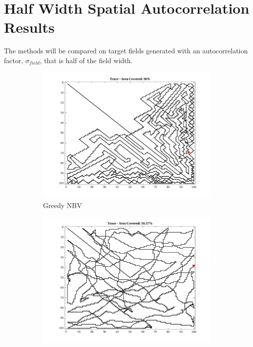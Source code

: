 \section{Half Width Spatial Autocorrelation Results}
The methods will be compared on target fields generated with an autocorrelation factor, $\sigma_{field}$, that is half of the field width.
\begin{figure}[htb!]
    \centering
    \begin{subfigure}[t]{0.25\textwidth}
        \centering
        \includegraphics[width=\linewidth]{figures/path_greedy_30p_100x100_sf_50_seed_1.png}
        \captionsetup{skip=0.20\baselineskip,size=footnotesize}
        \caption{Greedy NBV}
    \end{subfigure}%
    \begin{subfigure}[t]{0.25\textwidth}
        \centering
        \includegraphics[width=\linewidth]{figures/path_mc_30p_100x100_sf_50_seed_1.png}

\end{subfigure}
\end{figure}
